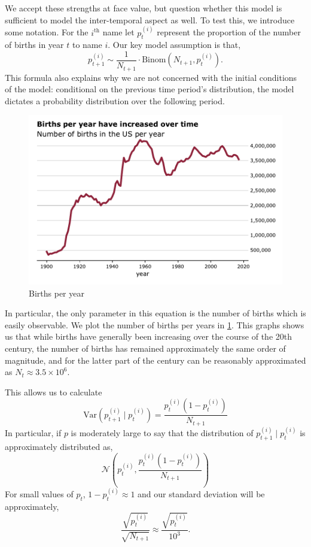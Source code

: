 \documentclass[a4paper]{article}
\newcommand{\var}{\text{Var}}
\begin{document}
We accept these strengths at face value, but question whether this model is
sufficient to model the inter-temporal aspect as well. To test this, we
introduce some notation. For the $i^\text{th}$ name let $p_t^{(i)}$ represent
the proportion of the number of births in year $t$ to name $i$. Our key model
assumption is that,
\[ p_{t+1}^{(i)} \sim \frac{1}{N_{t+1}} \cdot \text{Binom}(N_{t+1}, p_t^{(i)}).\]
This formula also explains why we are not concerned with the initial conditions
of the model: conditional on the previous time period's distribution, the model
dictates a probability distribution over the following period. 

\begin{figure}[h]
\centering
\includegraphics[width=.9\textwidth]{figs/births-per-year.pdf}
\caption{Births per year}
\label{fig:birthsyear}
\end{figure}

In particular, the only parameter in this equation is the number of births which
is easily observable. We plot the number of births per years in
\cref{fig:birthsyear}. This graphs shows us that while births have generally
been increasing over the course of the 20th century, the number of births has
remained approximately the same order of magnitude, and for the latter part of
the century can be reasonably approximated as $N_t \approx 3.5 \times 10^6$.

This allows us to calculate
\[ \var(p_{t+1}^{(i)} \mid p_t^{(i)}) =
\frac{p_t^{(i)}(1-p_t^{(i)})}{N_{t+1}}\]
In particular, if $p$ is moderately large to say that the distribution of
$p_{t+1}^{(i)} \mid p_t^{(i)}$ is approximately distributed as,
\[ \mathcal{N}\left( p_t^{(i)}, \frac{p_t^{(i)}(1-p_t^{(i)})}{N_{t+1}} \right)\]
For small values of $p_t$, $1-p_t^{(i)} \approx 1$ and our standard deviation
will be approximately,
\[ \frac{\sqrt{p_t^{(i)}}}{\sqrt{N_{t+1}}} \approx \frac{\sqrt{p_t^{(i)}}}{10^3}.\]
\end{document}
